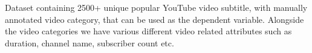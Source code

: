 
Dataset containing 2500+ unique popular YouTube video subtitle, with manually annotated video category, that can be used as the dependent variable. Alongside the video categories we have various different video related attributes such as duration, channel name, subscriber count etc.

\href{https://www.kaggle.com/datasets/praneshmukhopadhyay/youtubers-saying-things}{ }